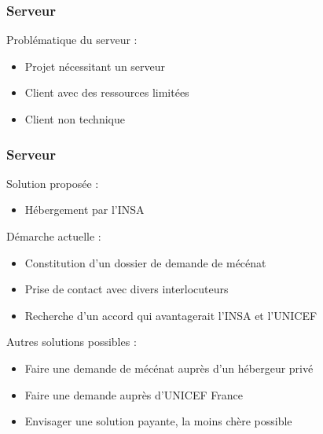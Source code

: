 \begin{frame}
	\frametitle{Serveur}

    Problématique du serveur :
      \begin{itemize}
        \item Projet nécessitant un serveur
        \item Client avec des ressources limitées
        \item Client non technique
      \end{itemize}
      
\end{frame}


\begin{frame}
	\frametitle{Serveur}
	Solution proposée :
	\begin{itemize}	
    \item Hébergement par l'INSA
    \end{itemize}
    Démarche actuelle :
      \begin{itemize}
        \item Constitution d'un dossier de demande de mécénat
        \item Prise de contact avec divers interlocuteurs
        \item Recherche d'un accord qui avantagerait l'INSA et l'UNICEF
      \end{itemize}
    Autres solutions possibles :
      \begin{itemize}
        \item Faire une demande de mécénat auprès d'un hébergeur privé
        \item Faire une demande auprès d'UNICEF France
        \item Envisager une solution payante, la moins chère possible
      \end{itemize}
\end{frame}